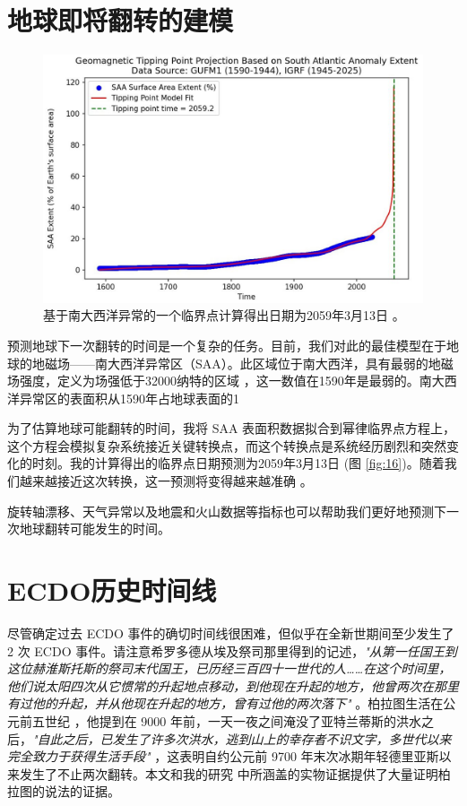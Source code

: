 \documentclass[10pt,twocolumn,letterpaper]{article}
\begin{document}
\section{地球即将翻转的建模}

\begin{figure}[b]
\begin{center}
   \includegraphics[width=1\linewidth]{saa-crop.jpeg}
\end{center}
   \caption{基于南大西洋异常的一个临界点计算得出日期为2059年3月13日 \cite{125,126}。}
\label{fig:16}
\label{fig:onecol}
\end{figure}

预测地球下一次翻转的时间是一个复杂的任务。目前，我们对此的最佳模型在于地球的地磁场——南大西洋异常区（SAA）。此区域位于南大西洋，具有最弱的地磁场强度，定义为场强低于32000纳特的区域 \cite{135}，这一数值在1590年是最弱的。南大西洋异常区的表面积从1590年占地球表面的1%

为了估算地球可能翻转的时间，我将 SAA 表面积数据拟合到幂律临界点方程上，这个方程会模拟复杂系统接近关键转换点，而这个转换点是系统经历剧烈和突然变化的时刻。我的计算得出的临界点日期预测为2059年3月13日 (图 \ref{fig:16})。随着我们越来越接近这次转换，这一预测将变得越来越准确 \cite{136}。

旋转轴漂移、天气异常以及地震和火山数据等指标也可以帮助我们更好地预测下一次地球翻转可能发生的时间。

\section{ECDO历史时间线}

尽管确定过去 ECDO 事件的确切时间线很困难，但似乎在全新世期间至少发生了 2 次 ECDO 事件。请注意希罗多德从埃及祭司那里得到的记述，\textit{"从第一任国王到这位赫淮斯托斯的祭司末代国王，已历经三百四十一世代的人……在这个时间里，他们说太阳四次从它惯常的升起地点移动，到他现在升起的地方，他曾两次在那里有过他的升起，并从他现在升起的地方，曾有过他的两次落下"} \cite{32}。柏拉图生活在公元前五世纪 \cite{111}，他提到在 9000 年前，一天一夜之间淹没了亚特兰蒂斯的洪水之后，\textit{"自此之后，已发生了许多次洪水，逃到山上的幸存者不识文字，多世代以来完全致力于获得生活手段"} \cite{112}，这表明自约公元前 9700 年末次冰期年轻德里亚斯以来发生了不止两次翻转。本文和我的研究 \cite{2} 中所涵盖的实物证据提供了大量证明柏拉图的说法的证据。
\end{document}
